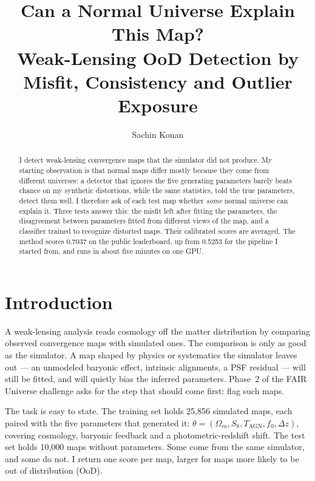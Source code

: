 \documentclass[10pt]{article}
\title{\Large Can a Normal Universe Explain This Map?\\[3pt]
\large Weak-Lensing OoD Detection by Misfit, Consistency and Outlier Exposure}
\author{Sachin Konan}
\date{}
\begin{document}
\maketitle

\begin{abstract}
I detect weak-lensing convergence maps that the simulator did not produce. My starting observation is that
normal maps differ mostly because they come from different universes: a detector that ignores the five generating
parameters barely beats chance on my synthetic distortions, while the same statistics, told the true parameters,
detect them well. I therefore ask of each test map whether \emph{some} normal universe can explain it. Three tests
answer this: the misfit left after fitting the parameters, the disagreement between parameters fitted from
different views of the map, and a classifier trained to recognize distorted maps. Their calibrated scores are
averaged. The method scores 0.7037 on the public leaderboard, up from 0.5253 for the pipeline I started from, and
runs in about five minutes on one GPU.
\end{abstract}

\section{Introduction}

A weak-lensing analysis reads cosmology off the matter distribution by comparing observed convergence maps with
simulated ones. The comparison is only as good as the simulator. A map shaped by physics or systematics the
simulator leaves out --- an unmodeled baryonic effect, intrinsic alignments, a PSF residual --- will still be fitted,
and will quietly bias the inferred parameters. Phase~2 of the FAIR Universe challenge asks for the step that should
come first: flag such maps.

The task is easy to state. The training set holds 25,856 simulated maps, each paired with the five parameters that
generated it: $\theta=(\Omega_m, S_8, T_{\mathrm{AGN}}, f_0, \Delta z)$, covering cosmology, baryonic feedback and a
photometric-redshift shift. The test set holds 10,000 maps without parameters. Some come from the same simulator,
and some do not. I return one score per map, larger for maps more likely to be out of distribution (OoD).
\end{document}
